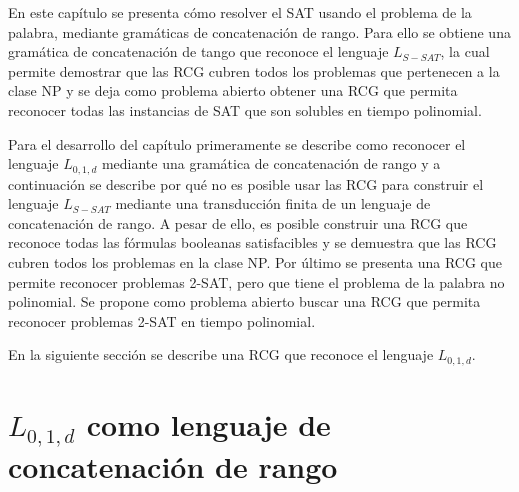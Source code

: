 



En este capítulo se presenta cómo resolver el SAT usando el problema de la palabra, mediante gramáticas de 
concatenación de rango. Para ello se obtiene una gramática de concatenación de tango que reconoce el lenguaje $L_{S-SAT}$, la cual permite demostrar que las RCG cubren todos los problemas que pertenecen a la clase NP y se deja como problema abierto obtener una RCG que permita reconocer todas las instancias de SAT que son solubles en tiempo polinomial.

Para el desarrollo del capítulo primeramente se describe como reconocer el lenguaje $L_{0,1,d}$ mediante una gramática de concatenación de rango y a continuación se describe por qué no es posible usar las RCG para construir el lenguaje $L_{S-SAT}$ mediante una transducción finita de un lenguaje de concatenación de rango. A pesar de ello, es posible construir una RCG que reconoce todas las fórmulas booleanas satisfacibles y se demuestra que las RCG cubren todos los problemas en la clase NP. Por último se presenta una RCG que permite reconocer problemas 2-SAT, pero que tiene el problema de la palabra no polinomial. Se propone como problema abierto buscar una RCG que permita reconocer problemas 2-SAT en tiempo polinomial.

En la siguiente sección se describe una RCG que reconoce el lenguaje $L_{0,1,d}$.

\section{$L_{0,1,d}$ como lenguaje de concatenación de rango}

